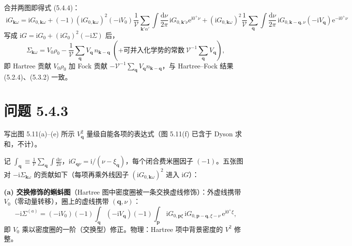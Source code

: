 合并两图即得式 (5.4.4)：
\begin{equation*}
\boxed{\;
\mathrm{i}G_{\pmb{k}\omega}=\mathrm{i}G_{0,\pmb{k}\omega}
+(-1)(\mathrm{i}G_{0,\pmb{k}\omega})^{2}(-\mathrm{i}V_0)\frac{1}{\mathcal V}\sum_{\pmb{k}'\alpha'}\int\frac{\mathrm{d}\nu}{2\pi}\,\mathrm{i}G_{0,\pmb{k}'\nu}\mathrm{e}^{\mathrm{i}0^{+}\nu}
+(\mathrm{i}G_{0,\pmb{k}\omega})^{2}\frac{1}{\mathcal V}\sum_{\pmb{q}}\int\frac{\mathrm{d}\nu}{2\pi}\,\mathrm{i}G_{0,\pmb{k}-\pmb{q},\nu}(-\mathrm{i}V_{\pmb{q}})\mathrm{e}^{-\mathrm{i}0^{+}\nu}\;}
\end{equation*}
写成 $\mathrm{i}G=\mathrm{i}G_0+(\mathrm{i}G_0)^{2}(-\mathrm{i}\Sigma)$ 后，
\begin{equation*}
\Sigma_{\pmb{k}\omega}=V_0\rho_0-\frac{1}{\mathcal V}\sum_{\pmb{q}}V_{\pmb{q}}\,n_{\pmb{k}-\pmb{q}}
\;(+\text{可并入化学势的常数}\ \mathcal V^{-1}\textstyle\sum_{\pmb{q}}V_{\pmb{q}}),
\end{equation*}
即 Hartree 贡献 $V_0\rho_0$ 加 Fock 贡献 $-\mathcal V^{-1}\sum_{\pmb{q}}V_{\pmb{q}}n_{\pmb{k}-\pmb{q}}$，与 Hartree--Fock 结果 (5.2.4)、(5.3.2) 一致。

\section*{问题 5.4.3}
\begin{problem}
写出图 5.11(a)--(e) 所示 $V_{\pmb q}^{2}$ 量级自能各项的表达式（图 5.11(f) 已含于 Dyson 求和，不计）。
\end{problem}
\solution

记 $\displaystyle\int_{\pmb q}\equiv\frac{1}{\mathcal V}\sum_{\pmb q}\int\frac{\mathrm{d}\nu}{2\pi}$，$\mathrm{i}G_{\pmb q\nu}=\mathrm{i}/(\nu-\xi_{\pmb q})$，每个闭合费米圈因子 $(-1)$。五张图对 $-\mathrm{i}\Sigma_{\pmb{k}\omega}$ 的贡献如下（每项再乘外线因子 $(\mathrm{i}G_{0,\pmb{k}\omega})^{2}$ 进入 $\mathrm{i}G$）：

\textbf{(a) 交换修饰的蝌蚪图}（Hartree 图中密度圈被一条交换虚线修饰）：外虚线携带 $V_0$（零动量转移），圈上的虚线携带 $(\pmb q,\nu)$：
\begin{equation*}
-\mathrm{i}\Sigma^{(a)}
=(-\mathrm{i}V_0)(-1)\int_{\pmb q}(-\mathrm{i}V_{\pmb q})(-1)
\int_{\pmb p}\,\mathrm{i}G_{0,\pmb p\xi}\,\mathrm{i}G_{0,\pmb p-\pmb q,\xi-\nu}\,\mathrm{e}^{\mathrm{i}0^{+}\xi} ,
\end{equation*}
即 $V_0$ 乘以密度圈的一阶（交换型）修正。物理：Hartree 项中背景密度的 $V^{2}$ 修整。

